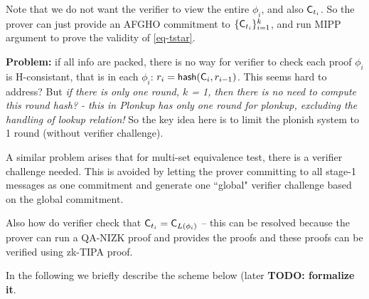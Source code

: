 Note that we do not want the verifier to view the entire
$\phi_i$, and also ${\mathsf{C}}_{t_i}$. So the prover can just
provide an AFGHO commitment to $\{{\mathsf{C}}_{t_i}\}_{i=1}^k$,
and run MIPP argument to prove the validity of
\ref{eq-tstar}.

{\bf Problem:} if all info are packed, there is no way for
verifier to check each proof $\phi_i$ is H-consistant,
that is in each $\phi_i$: $r_i = \mathsf{hash}({\mathsf{C}}_i, r_{i-1})$.
This seems hard to address? But {\em if there is only one round,
$k$ = 1, then there is no need to compute this round hash? - 
this in Plonkup has only one round for plonkup, excluding
the handling of lookup relation!} So the key idea here is to limit
the plonish system to 1 round (without verifier challenge).

A similar problem arises that for multi-set equivalence test,
there is a verifier challenge needed. This is avoided by
letting the prover committing to all stage-1 messages as one
commitment and generate one ``global" verifier challenge based
on the global commitment. 

Also how do verifier check that ${\mathsf{C}}_{t_i} = {\mathsf{C}}_{L(\phi_i)}$
-- this can be resolved because the prover can run a QA-NIZK proof
and provides the proofs and these proofs can be verified
using zk-TIPA proof.

In the following we briefly describe the scheme below (later
{\bf TODO:  formalize it}.


